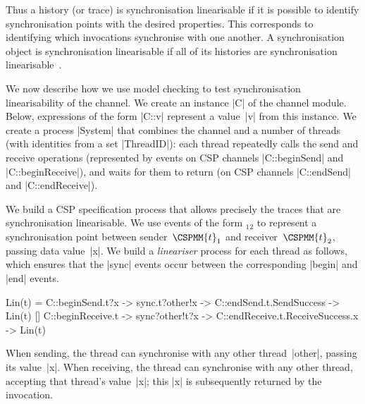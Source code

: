 Thus a history (or trace) is synchronisation linearisable if it is possible to
identify synchronisation points with the desired properties.  This corresponds
to identifying which invocations synchronise with one another.  A
synchronisation object is synchronisation linearisable if all of its histories
are synchronisation linearisable~\cite{LL:synchronisation}.


\inlineCSP

We now describe how we use model checking to test synchronisation
linearisability of the channel.  We create an instance |C| of the channel
module.  Below, expressions of the form |C::v| represent a value~|v| from this
instance.  We create a process |System| that combines the channel and a number
of threads (with identities from a set |ThreadID|): each thread repeatedly
calls the send and receive operations (represented by events on CSP channels
|C::beginSend| and |C::beginReceive|), and waits for them to return (on CSP
channels |C::endSend| and |C::endReceive|).

We build a CSP specification process that allows precisely the traces that are
synchronisation linearisable.  We use events of the form
$_1$$_2$ to represent a synchronisation point
between sender~$\CSPMM{t}_1$ and receiver~$\CSPMM{t}_2$, passing data
value~|x|.  We build a \emph{lineariser} process for each thread as follows,
which ensures that the |sync| events occur between the corresponding |begin|
and |end| events.
%
\begin{cspm}
Lin(t) = 
  C::beginSend.t?x -> sync.t?other!x -> C::endSend.t.SendSuccess -> Lin(t)
  [] C::beginReceive.t -> sync?other!t?x -> C::endReceive.t.ReceiveSuccess.x -> Lin(t)
\end{cspm}
%
When sending, the thread can synchronise with any other thread~|other|,
passing its value~|x|.  When receiving, the thread can synchronise with any
other thread, accepting that thread's value~|x|; this |x| is subsequently
returned by the invocation.

